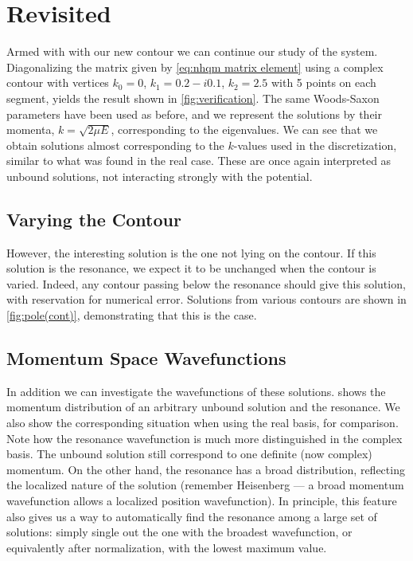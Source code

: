 \documentclass[../main/report.tex]{subfiles}
\begin{document}
\section{ Revisited}
Armed with with our new contour we can continue our study of the  system. 
Diagonalizing the matrix given by \cref{eq:nhqm matrix element} using a complex contour with vertices $k_0 = 0$, $k_1 = 0.2 - i0.1$, $k_2 = 2.5$ 
with 5 points on each segment, yields the result shown in \cref{fig:verification}.
The same Woods-Saxon parameters have been used as before, and we represent the solutions by their momenta, $k=\sqrt{2\mu E}$, corresponding to the eigenvalues. 
We can see that we obtain solutions almost corresponding to the $k$-values used in the discretization, similar to what was found in the real case. 
These are once again interpreted as unbound solutions, not interacting strongly with the potential.

\subsection{Varying the Contour}

However, the interesting solution is the one not lying on the contour. If this solution is the resonance, we expect it to be unchanged when the contour is varied. 
Indeed, any contour passing below the resonance should give this solution, with reservation for numerical error. 
Solutions from various contours are shown in \cref{fig:pole(cont)}, demonstrating that this is the case.

\subsection{Momentum Space Wavefunctions}

In addition we can investigate the wavefunctions of these solutions. 
 shows the momentum distribution of an arbitrary unbound solution and the resonance. We also show the corresponding situation when using the real basis, for comparison. Note how the resonance wavefunction is much more distinguished in the complex basis.  
The unbound solution still correspond to one definite (now complex) momentum. 
On the other hand, the resonance has a broad distribution, reflecting the localized nature of the solution 
(remember Heisenberg --- a broad momentum wavefunction allows a localized position wavefunction). 
In principle, this feature also gives us a way to automatically find the resonance among a large set of solutions: 
simply single out the one with the broadest wavefunction, or equivalently after normalization, with the lowest maximum value.
\end{document}
